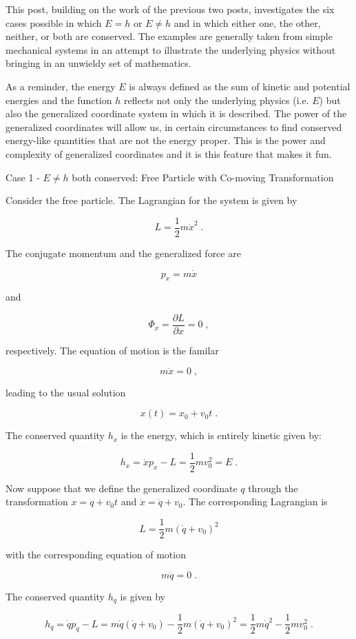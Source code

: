 \documentclass[12pt]{article}
\begin{document}
This post, building on the work of the previous two posts, investigates the six cases possible in which $E=h$ or $E\neq h$ and in which either one, the other, neither, or both are conserved.  The examples are generally taken from simple mechanical systems in an attempt to illustrate the underlying physics without bringing in an unwieldy set of mathematics. 

As a reminder, the energy $E$ is always defined as the sum of kinetic and potential energies and the function $h$ reflects not only the underlying physics (i.e.  $E$) but also the generalized coordinate system in which it is described.  The power of the generalized coordinates will allow us, in certain circumstances to find conserved energy-like quantities that are not the energy proper.  This is the power and complexity of generalized coordinates and it is this feature that makes it fun.

Case 1 - $E \neq h$ both conserved: Free Particle with Co-moving Transformation

Consider the free particle.  The Lagrangian for the system is given by

\[ L = \frac{1}{2} m {\dot x}^2 \; .\]

The conjugate momentum and the generalized force are

\[ p_x = m {\dot x} \]

and

\[ \Phi_x = \frac{\partial L}{\partial x} = 0 \; , \]

respectively.  The equation of motion is the familar 

\[ m \ddot x = 0 \; ,\]

leading to the usual solution 

\[ x(t) = x_0 + v_0 t \; .\]

The conserved quantity $h_x$ is the energy, which is entirely kinetic given by:

\[ h_x = \dot x p_x - L = \frac{1}{2} m v_0^2 = E\; .\]

Now suppose that we define the generalized coordinate $q$ through the transformation $x = q + v_0 t$ and $\dot x = \dot q + v_0$.  The corresponding Lagrangian is

\[ L = \frac{1}{2} m \left(\dot q + v_0 \right)^2 \]

with the corresponding equation of motion

\[ m \ddot q = 0 \; . \]

The conserved quantity $h_q$ is given by

\[ h_q = \dot q p_q - L = m \dot q (\dot q + v_0) - \frac{1}{2} m (\dot q + v_0)^2 = \frac{1}{2} m \dot q^2  - \frac{1}{2} m v_0^2 \; .\]
\end{document}
